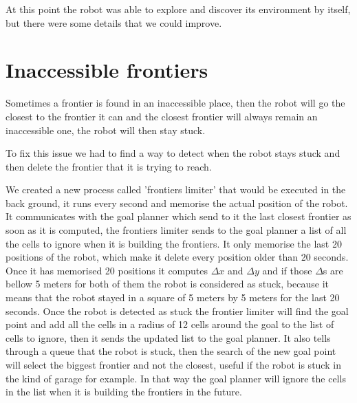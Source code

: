 At this point the robot was able to explore and discover its environment by itself, but there were some details that we could improve.

\section{Inaccessible frontiers}

Sometimes a frontier is found in an inaccessible place, then the robot will go the closest to the frontier it can and the closest frontier will always remain an inaccessible one, the robot will then stay stuck.

To fix this issue we had to find a way to detect when the robot stays stuck and then delete the frontier that it is trying to reach.

We created a new process called 'frontiers limiter' that would be executed in the back ground, it runs every second and memorise the actual position of the robot.
It communicates with the goal planner which send to it the last closest frontier as soon as it is computed, the frontiers limiter sends to the goal planner a list of all the cells to ignore when it is building the frontiers.
It only memorise the last 20 positions of the robot, which make it delete every position older than 20 seconds.
Once it has memorised 20 positions it computes $\Delta x$ and $\Delta y$ and if those $\Delta$s are bellow 5 meters for both of them the robot is considered as stuck, because it means that the robot stayed in a square of 5 meters by 5 meters for the last 20 seconds.
Once the robot is detected as stuck the frontier limiter will find the goal point and add all the cells in a radius of 12 cells around the goal to the list of cells to ignore, then it sends the updated list to the goal planner.
It also tells through a queue that the robot is stuck, then the search of the new goal point will select the biggest frontier and not the closest, useful if the robot is stuck in the kind of garage for example.
In that way the goal planner will ignore the cells in the list when it is building the frontiers in the future.

